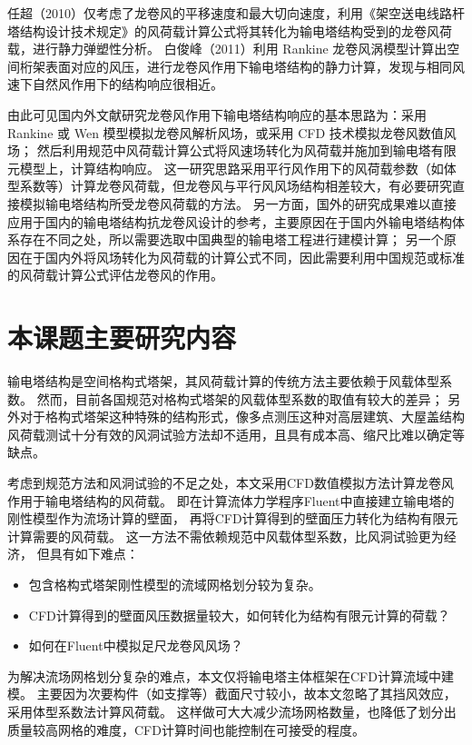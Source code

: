 任超（2010）\cite{ren2010tower}仅考虑了龙卷风的平移速度和最大切向速度，利用《架空送电线路杆塔结构设计技术规定》的风荷载计算公式将其转化为输电塔结构受到的龙卷风荷载，进行静力弹塑性分析。
白俊峰（2011）\cite{bai2011tornado}利用 Rankine 龙卷风涡模型计算出空间桁架表面对应的风压，进行龙卷风作用下输电塔结构的静力计算，发现与相同风速下自然风作用下的结构响应很相近。

由此可见国内外文献研究龙卷风作用下输电塔结构响应的基本思路为：采用 Rankine 或 Wen 模型模拟龙卷风解析风场，或采用 CFD 技术模拟龙卷风数值风场；
然后利用规范中风荷载计算公式将风速场转化为风荷载并施加到输电塔有限元模型上，计算结构响应。
这一研究思路采用平行风作用下的风荷载参数（如体型系数等）计算龙卷风荷载，但龙卷风与平行风风场结构相差较大，有必要研究直接模拟输电塔结构所受龙卷风荷载的方法。
另一方面，国外的研究成果难以直接应用于国内的输电塔结构抗龙卷风设计的参考，主要原因在于国内外输电塔结构体系存在不同之处，所以需要选取中国典型的输电塔工程进行建模计算；
另一个原因在于国内外将风场转化为风荷载的计算公式不同，因此需要利用中国规范或标准的风荷载计算公式评估龙卷风的作用。


\section{本课题主要研究内容}

输电塔结构是空间格构式塔架，其风荷载计算的传统方法主要依赖于风载体型系数。
然而，目前各国规范对格构式塔架的风载体型系数的取值有较大的差异；
另外对于格构式塔架这种特殊的结构形式，像多点测压这种对高层建筑、大屋盖结构风荷载测试十分有效的风洞试验方法却不适用，且具有成本高、缩尺比难以确定等缺点。

考虑到规范方法和风洞试验的不足之处，本文采用CFD数值模拟方法计算龙卷风作用于输电塔结构的风荷载。
即在计算流体力学程序Fluent中直接建立输电塔的刚性模型作为流场计算的壁面，
再将CFD计算得到的壁面压力转化为结构有限元计算需要的风荷载。
这一方法不需依赖规范中风载体型系数，比风洞试验更为经济，
但具有如下难点：

\begin{itemize}
  \item 包含格构式塔架刚性模型的流域网格划分较为复杂。
  \item CFD计算得到的壁面风压数据量较大，如何转化为结构有限元计算的荷载？
  \item 如何在Fluent中模拟足尺龙卷风风场？
\end{itemize}

为解决流场网格划分复杂的难点，本文仅将输电塔主体框架在CFD计算流域中建模。
主要因为次要构件（如支撑等）截面尺寸较小，故本文忽略了其挡风效应，采用体型系数法计算风荷载。
这样做可大大减少流场网格数量，也降低了划分出质量较高网格的难度，CFD计算时间也能控制在可接受的程度。

